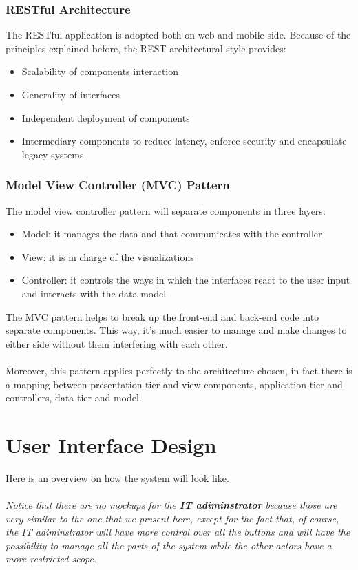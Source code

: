 \documentclass[10pt]{report}
\begin{document}
\subsection{RESTful Architecture}
The RESTful application is adopted both on web and mobile side.
Because of the principles explained before, the REST architectural style provides:
\begin{itemize}
    \item Scalability of components interaction
    \item Generality of interfaces
    \item Independent deployment of components
    \item Intermediary components to reduce latency, enforce security and encapsulate legacy systems
\end{itemize}
\subsection{Model View Controller (MVC) Pattern}
The model view controller pattern will separate components in three layers:
\begin{itemize}
    \item Model: it manages the data and that communicates with the controller
    \item View: it is in charge of the visualizations
    \item Controller: it controls the ways in which the interfaces react to the user input and interacts with the data model
\end{itemize}
The MVC pattern helps to break up the front-end and back-end code into separate components. This way, it's much easier to manage and make changes to either side without them interfering with each other.\\ \\
Moreover, this pattern applies perfectly to the architecture chosen, in fact there is a mapping between presentation tier and view components, application tier and controllers, data tier and model.
\chapter{User Interface Design}
Here is an overview on how the system will look like.\\ \\
\textit{Notice that there are no mockups for the \textbf{IT adiminstrator} because those are very similar to the one that we present here, except for the fact that, of course, the IT adiminstrator will have more control over all the buttons and will have the possibility to manage all the parts of the system while the other actors have a more restricted scope.}
\end{document}
